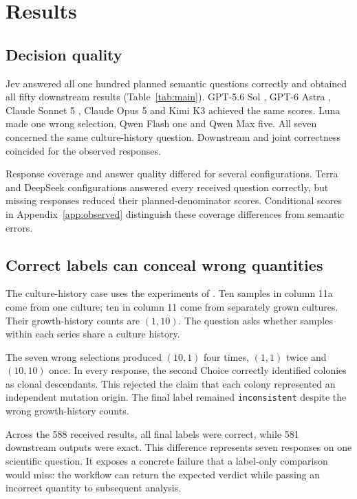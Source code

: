 \documentclass[11pt]{article}
\begin{document}
\section{Results}
\label{sec:results}

\subsection{Decision quality}

Jev answered all one hundred planned semantic questions correctly and obtained all fifty downstream results (Table~\ref{tab:main}). GPT-5.6 Sol \citep{openai2026gpt56}, GPT-6 Astra \citep{openai2026gpt6astra}, Claude Sonnet 5 \citep{anthropic2026sonnet5}, Claude Opus 5 \citep{anthropic2026opus5} and Kimi K3 \citep{moonshot2026kimik3} achieved the same scores. Luna made one wrong selection, Qwen Flash \citep{qwen2026flash} one and Qwen Max \citep{alibaba2026qwen38max} five. All seven concerned the same culture-history question. Downstream and joint correctness coincided for the observed responses.

Response coverage and answer quality differed for several configurations. Terra and DeepSeek configurations \citep{deepseek2026v41flash,deepseek2026v4pro0813} answered every received question correctly, but missing responses reduced their planned-denominator scores. Conditional scores in Appendix~\ref{app:observed} distinguish these coverage differences from semantic errors.

\subsection{Correct labels can conceal wrong quantities}
\label{sec:errors}

The culture-history case uses the experiments of \citet{luria1943mutations}. Ten samples in column 11a come from one culture; ten in column 11 come from separately grown cultures. Their growth-history counts are $(1,10)$. The question asks whether samples within each series share a culture history.

The seven wrong selections produced $(10,1)$ four times, $(1,1)$ twice and $(10,10)$ once. In every response, the second Choice correctly identified colonies as clonal descendants. This rejected the claim that each colony represented an independent mutation origin. The final label remained \texttt{inconsistent} despite the wrong growth-history counts.

Across the 588 received results, all final labels were correct, while 581 downstream outputs were exact. This difference represents seven responses on one scientific question. It exposes a concrete failure that a label-only comparison would miss: the workflow can return the expected verdict while passing an incorrect quantity to subsequent analysis.
\end{document}
